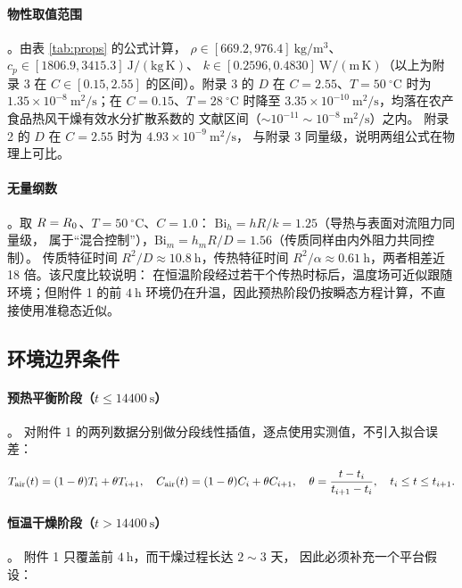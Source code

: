\paragraph{物性取值范围}。由表 \ref{tab:props} 的公式计算，
$\rho\in[669.2,976.4]\ \mathrm{kg/m^3}$、$c_p\in[1806.9,3415.3]\ \mathrm{J/(kg\,K)}$、
$k\in[0.2596,0.4830]\ \mathrm{W/(m\,K)}$（以上为附录 3 在
$C\in[0.15,2.55]$ 的区间）。附录 3 的 $D$ 在 $C=2.55$、$T=50\ ^\circ\mathrm{C}$
时为 $1.35\times10^{-8}\ \mathrm{m^2/s}$；在 $C=0.15$、$T=28\ ^\circ\mathrm{C}$
时降至 $3.35\times10^{-10}\ \mathrm{m^2/s}$，均落在农产食品热风干燥有效水分扩散系数的
文献区间（$\sim10^{-11}\sim10^{-8}\ \mathrm{m^2/s}$）之内。
附录 2 的 $D$ 在 $C=2.55$ 时为 $4.93\times10^{-9}\ \mathrm{m^2/s}$，
与附录 3 同量级，说明两组公式在物理上可比。

\paragraph{无量纲数}。取 $R=R_{0}$、$T=50\ ^\circ\mathrm{C}$、$C=1.0$：
$\mathrm{Bi}_h=hR/k=1.25$（导热与表面对流阻力同量级，
属于“混合控制”），$\mathrm{Bi}_m=h_mR/D=1.56$（传质同样由内外阻力共同控制）。
传质特征时间 $R^2/D\approx10.8\ \mathrm{h}$，传热特征时间
$R^2/\alpha\approx0.61\ \mathrm{h}$，两者相差近 18 倍。该尺度比较说明：
在恒温阶段经过若干个传热时标后，温度场可近似跟随环境；但附件 1 的前
$4\ \mathrm{h}$ 环境仍在升温，因此预热阶段仍按瞬态方程计算，不直接使用准稳态近似。

\subsection{环境边界条件}

\paragraph{预热平衡阶段（$t\le14400\ \mathrm{s}$）}。
对附件 1 的两列数据分别做分段线性插值，逐点使用实测值，不引入拟合误差：

\begin{equation}
T_{\mathrm{air}}(t)=(1-\theta)T_i+\theta T_{i+1},\quad
C_{\mathrm{air}}(t)=(1-\theta)C_i+\theta C_{i+1},\quad
\theta=\frac{t-t_i}{t_{i+1}-t_i},\quad t_i\le t\le t_{i+1}.
\end{equation}

\paragraph{恒温干燥阶段（$t>14400\ \mathrm{s}$）}。
附件 1 只覆盖前 $4\ \mathrm{h}$，而干燥过程长达 $2\sim3$ 天，
因此必须补充一个平台假设：

